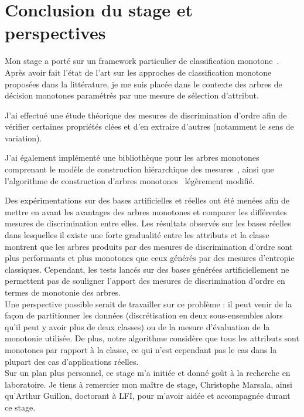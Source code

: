 \documentclass[a4paper]{article}
\begin{document}
\section{Conclusion du stage et perspectives} 

Mon stage a porté sur un framework particulier de classification
monotone~\cite{marsala-rank}. Après avoir fait l'état de l'art sur les approches
de classification monotone proposées dans la littérature, je me suis placée dans
le contexte des arbres de décision monotones paramétrés par une mesure de
sélection d'attribut.

J'ai effectué une étude théorique des mesures de discrimination d'ordre afin de
vérifier certaines propriétés clées et d'en extraire d'autres (notamment le sens
de variation). 

J'ai également implémenté
une bibliothèque pour les arbres monotones comprenant le modèle de construction
hiérarchique des mesures~\cite{marsala-rank}, ainsi que l'algorithme de
construction d'arbres monotones~\cite{marsala-rank} légèrement modifié. 

Des expérimentations sur des bases artificielles et réelles ont été menées afin de
mettre en avant les avantages des arbres monotones et comparer les différentes
mesures de discrimination entre elles. Les résultats observés sur les bases
réelles dans lesquelles il existe une forte gradualité entre les attributs et la
classe montrent que les arbres produits par des mesures de discrimination
d'ordre sont plus performants et plus monotones que ceux générés par des mesures
d'entropie classiques. Cependant, les tests lancés sur des bases générées
artificiellement ne permettent pas de souligner l'apport des mesures de
discrimination d'ordre en termes de monotonie des
arbres. \\

Une perspective possible serait de travailler sur ce problème : il peut venir de la façon de partitionner les données (discrétisation en deux sous-ensembles
alors qu'il peut y avoir plus de deux classes) ou de la mesure d'évaluation de la
monotonie utilisée. De plus, notre algorithme considère que tous les attributs
sont monotones par rapport à la classe, ce qui n'est cependant pas le cas dans
la plupart des cas d'applications réelles. \\

Sur un plan plus personnel, ce stage m'a initiée et donné goût à la recherche en
laboratoire. Je tiens à remercier mon maître de stage, Christophe Marsala, ainsi
qu'Arthur Guillon, doctorant à LFI, pour m'avoir aidée et accompagnée durant ce
stage.
\end{document}
